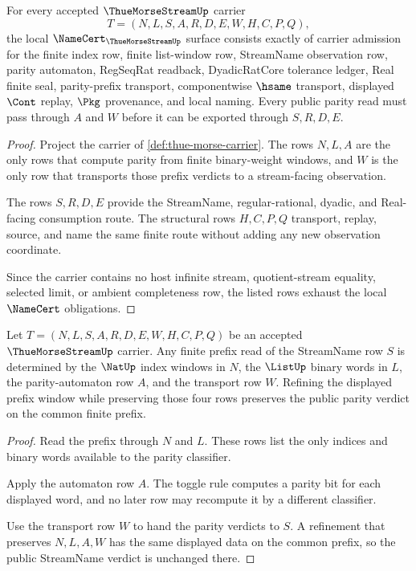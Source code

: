 \begin{theorem}\label{thm:thue-morse-namecert-obligations}
For every accepted $\ThueMorseStreamUp$ carrier
$$
T=(N,L,S,A,R,D,E,W,H,C,P,Q),
$$
the local $\NameCert_{\ThueMorseStreamUp}$ surface consists exactly of carrier admission for the finite index row, finite list-window row, StreamName observation row, parity automaton, RegSeqRat readback, DyadicRatCore tolerance ledger, Real finite seal, parity-prefix transport, componentwise $\hsame$ transport, displayed $\Cont$ replay, $\Pkg$ provenance, and local naming. Every public parity read must pass through $A$ and $W$ before it can be exported through $S,R,D,E$.
\end{theorem}
\begin{proof}
Project the carrier of \autoref{def:thue-morse-carrier}. The rows $N,L,A$ are the only rows that compute parity from finite binary-weight windows, and $W$ is the only row that transports those prefix verdicts to a stream-facing observation.

The rows $S,R,D,E$ provide the StreamName, regular-rational, dyadic, and Real-facing consumption route. The structural rows $H,C,P,Q$ transport, replay, source, and name the same finite route without adding any new observation coordinate.

Since the carrier contains no host infinite stream, quotient-stream equality, selected limit, or ambient completeness row, the listed rows exhaust the local $\NameCert$ obligations.
\end{proof}

\begin{theorem}\label{thm:thue-morse-parity-prefix-transport}
Let $T=(N,L,S,A,R,D,E,W,H,C,P,Q)$ be an accepted $\ThueMorseStreamUp$ carrier. Any finite prefix read of the StreamName row $S$ is determined by the $\NatUp$ index windows in $N$, the $\ListUp$ binary words in $L$, the parity-automaton row $A$, and the transport row $W$. Refining the displayed prefix window while preserving those four rows preserves the public parity verdict on the common finite prefix.
\end{theorem}
\begin{proof}
Read the prefix through $N$ and $L$. These rows list the only indices and binary words available to the parity classifier.

Apply the automaton row $A$. The toggle rule computes a parity bit for each displayed word, and no later row may recompute it by a different classifier.

Use the transport row $W$ to hand the parity verdicts to $S$. A refinement that preserves $N,L,A,W$ has the same displayed data on the common prefix, so the public StreamName verdict is unchanged there.
\end{proof}

